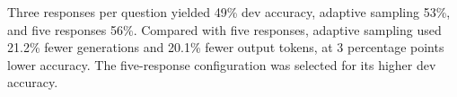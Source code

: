 Three responses per question yielded 49\% dev accuracy, adaptive sampling 53\%, and five responses 56\%. Compared with five responses, adaptive sampling used 21.2\% fewer generations and 20.1\% fewer output tokens, at 3 percentage points lower accuracy. The five-response configuration was selected for its higher dev accuracy. 
